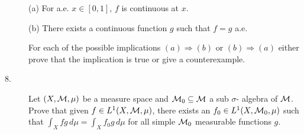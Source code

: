 \documentclass[11pt]{article}
\def\ds{\displaystyle}
\def\ds{\displaystyle}
\begin{document}
\begin{large}
\begin{description}
\item[\quad] (a)
For a.e. $x\in[0,1]$, $f$ is continuous at $x$.

\item[\quad] (b)
There exists a continuous function $g$ such that $f=g$ a.e.

\item[]
For each of the possible implications
$(a)\Rightarrow(b)$ or $(b)\Rightarrow(a)$
either prove that the implication is true or
give a counterexample.


\vspace{.15in}
\item[8.]
Let $(X,\cal{M},\mu)$ be a measure space and ${\cal{M}}_{0}\subseteq 
\cal{M}$
a sub $\sigma$- algebra of $\cal{M}$.
Prove that given $f\in L^1(X, \cal{M},\mu)$, there exists an
$f_0\in L^1(X,{\cal{M}}_{0},\mu)$ such that $\ds\int_X fg\,d\mu=\ds\int_X 
f_0 g\,d\mu$
for all simple ${\cal{M}}_{0}$ measurable functions $g$.



\end{description}
\end{large}
\end{document}
